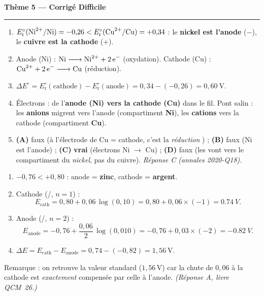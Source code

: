 \documentclass[11pt,a4paper]{article}
\newcommand{\Ered}{\ensuremath{E_{\mathrm{r}}^{\circ}}}
\newcommand{\fem}{\ensuremath{\Delta E}}
\begin{document}
\begin{center}
{\LARGE\bfseries\color{primarydark}Thème 5 — Corrigé Difficile}\\[-2pt]
{\color{corrcol}\rule{\textwidth}{1pt}}
\end{center}

\begin{corr}
\begin{enumerate}[label=\textbf{\alph*)},leftmargin=2.2em,topsep=2pt,itemsep=2pt]
  \item $\Ered(\ce{Ni^{2+}}/\ce{Ni})=-0{,}26 < \Ered(\ce{Cu^{2+}}/\ce{Cu})=+0{,}34$ :
        le \textbf{nickel est l'anode} ($-$), le \textbf{cuivre est la cathode} ($+$).
  \item Anode (Ni) : $\ce{Ni -> Ni^{2+} + 2 e^-}$ (oxydation).
        Cathode (Cu) : $\ce{Cu^{2+} + 2 e^- -> Cu}$ (réduction).
  \item $\fem^{\circ}=\Ered(\text{cathode})-\Ered(\text{anode})=0{,}34-(-0{,}26)=\boxed{0{,}60\ \mathrm{V}}$.
  \item Électrons : de l'\textbf{anode (Ni) vers la cathode (Cu)} dans le fil. Pont salin : les \textbf{anions
        } migrent vers l'anode (compartiment \textbf{Ni}), les \textbf{cations } vers la
        cathode (compartiment \textbf{Cu}).
  \item \textbf{(A)} faux (à l'électrode de Cu = cathode, c'est la \emph{réduction} ) ;
        \textbf{(B)} faux (Ni est l'anode) ;
        \textbf{(C)} \textbf{vrai} (électrons Ni $\to$ Cu) ;
        \textbf{(D)} faux (les  vont vers le compartiment du \emph{nickel}, pas du cuivre).
        \emph{Réponse C (annales 2020-Q18).}
\end{enumerate}
\end{corr}

\begin{corr}
\begin{enumerate}[label=\textbf{\alph*)},leftmargin=2.2em,topsep=2pt,itemsep=2pt]
  \item $-0{,}76<+0{,}80$ : anode = \textbf{zinc}, cathode = \textbf{argent}.
  \item Cathode (/, $n=1$) :
        \[
        E_{\text{cath}} = 0{,}80 + 0{,}06\,\log(0{,}10) = 0{,}80 + 0{,}06\times(-1) = \SI{0.74}{V}.
        \]
  \item Anode (/, $n=2$) :
        \[
        E_{\text{anode}} = -0{,}76 + \frac{0{,}06}{2}\,\log(0{,}010) = -0{,}76 + 0{,}03\times(-2) = \SI{-0.82}{V}.
        \]
  \item $\fem = E_{\text{cath}} - E_{\text{anode}} = 0{,}74 - (-0{,}82) = \boxed{1{,}56\ \mathrm{V}}$.
\end{enumerate}
Remarque : on retrouve la valeur standard ($1{,}56$\,V) car la chute de $0{,}06$ à la cathode est
\emph{exactement} compensée par celle à l'anode. \emph{(Réponse A, livre QCM~26.)}
\end{corr}
\end{document}
